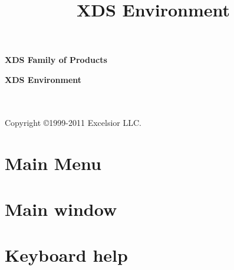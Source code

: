 \newif\ifonline
\newif\ifenglish \englishtrue
\newcommand{\bs}{$\backslash$}
\newif\ifcomment
\title{XDS Environment}



\begin{center}
{\LARGE \bf XDS Family of Products\\}

{\Huge \bf XDS Environment\\}

\\\\Copyright \copyright 1999-2011 Excelsior LLC.
\end{center}

\chapter{Main Menu}
\label{mainmenu}


\chapter{Main window}
\label{mainwin}


\chapter{Keyboard help}






